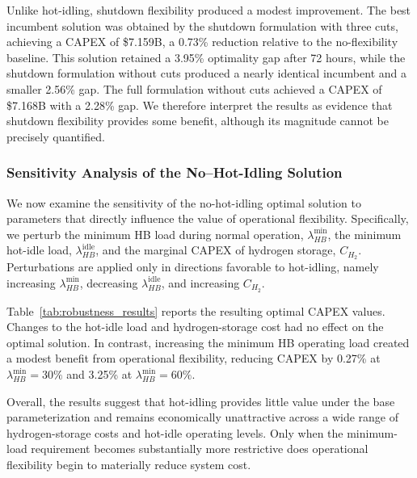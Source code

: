 \documentclass[11pt, letter]{article}
\begin{document}
Unlike hot-idling, shutdown flexibility produced a modest improvement. The best incumbent solution was obtained by the shutdown formulation with three cuts, achieving a CAPEX of \$7.159B, a 0.73\% reduction relative to the no-flexibility baseline. This solution retained a 3.95\% optimality gap after 72 hours, while the shutdown formulation without cuts produced a nearly identical incumbent and a smaller 2.56\% gap. The full formulation without cuts achieved a CAPEX of \$7.168B with a 2.28\% gap. We therefore interpret the results as evidence that shutdown flexibility provides some benefit, although its magnitude cannot be precisely quantified.




\subsubsection{Sensitivity Analysis of the No--Hot-Idling Solution}\label{sec:robustness}
We now examine the sensitivity of the no-hot-idling optimal solution to parameters that directly influence the value of operational flexibility. Specifically, we perturb the minimum HB load during normal operation, $\lambda_{HB}^{\min}$, the minimum hot-idle load, $\lambda_{HB}^{\mathrm{idle}}$, and the marginal CAPEX of hydrogen storage, $C_{H_2}$. Perturbations are applied only in directions favorable to hot-idling, namely increasing $\lambda_{HB}^{\min}$, decreasing $\lambda_{HB}^{\mathrm{idle}}$, and increasing $C_{H_2}$.

Table~\ref{tab:robustness_results} reports the resulting optimal CAPEX values. Changes to the hot-idle load and hydrogen-storage cost had no effect on the optimal solution. In contrast, increasing the minimum HB operating load created a modest benefit from operational flexibility, reducing CAPEX by 0.27\% at $\lambda_{HB}^{\min}=30\%$ and 3.25\% at $\lambda_{HB}^{\min}=60\%$.

Overall, the results suggest that hot-idling provides little value under the base parameterization and remains economically unattractive across a wide range of hydrogen-storage costs and hot-idle operating levels. Only when the minimum-load requirement becomes substantially more restrictive does operational flexibility begin to materially reduce system cost.
\end{document}
